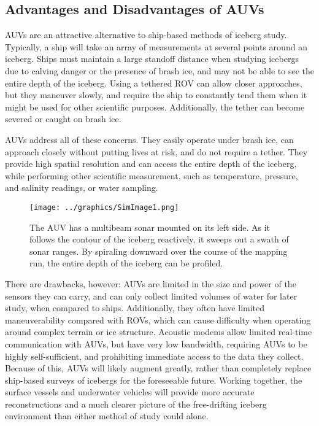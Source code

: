 \subsection{Advantages and Disadvantages of AUVs}

AUVs are an attractive alternative to ship-based methods of iceberg study. Typically, a ship will take an array of measurements at several points around an iceberg. Ships must maintain a large standoff distance when studying icebergs due to calving danger or the presence of brash ice, and may not be able to see the entire depth of the iceberg. Using a tethered ROV can allow closer approaches, but they maneuver slowly, and require the ship to constantly tend them when it might be used for other scientific purposes. Additionally, the tether can become severed or caught on brash ice.

AUVs address all of these concerns. They easily operate under brash ice, can approach closely without putting lives at risk, and do not require a tether. They provide high spatial resolution and can access the entire depth of the iceberg, while performing other scientific measurement, such as temperature, pressure, and salinity readings, or water sampling. 


\begin{figure}[htbp]
   \centering
   \texttt{[image: ../graphics/SimImage1.png]} %
   \caption{The AUV has a multibeam sonar mounted on its left side. As it follows the contour of the iceberg reactively, it sweeps out a swath of sonar ranges. By spiraling downward over the course of the mapping run, the entire depth of the iceberg can be profiled.}
   \label{fig:simImage1}
\end{figure}


There are drawbacks, however: AUVs are limited in the size and power of the sensors they can carry, and can only collect limited volumes of water for later study, when compared to ships. Additionally, they often have limited maneuverability compared with ROVs, which can cause difficulty when operating around complex terrain or ice structure. Acoustic modems allow limited real-time communication with AUVs, but have very low bandwidth, requiring AUVs to be highly self-sufficient, and prohibiting immediate access to the data they collect. Because of this, AUVs will likely augment greatly, rather than completely replace ship-based surveys of icebergs for the foreseeable future. Working together, the surface vessels and underwater vehicles will provide more accurate reconstructions and a much clearer picture of the free-drifting iceberg environment than either method of study could alone.

